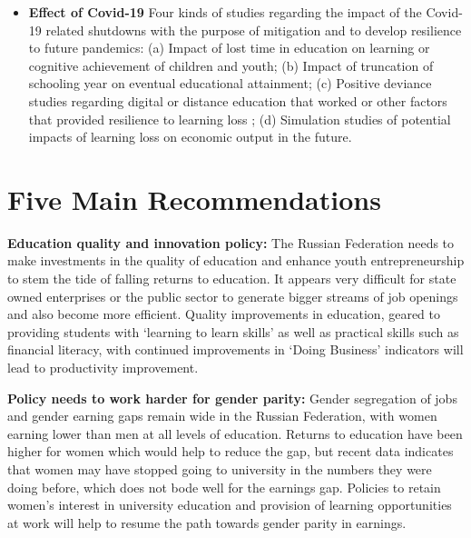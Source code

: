 \documentclass[alpha-refs]{wiley-article-04t}
\begin{document}
\begin{itemize}
\item \textbf{Effect of Covid-19} Four kinds of 
studies regarding the impact of the Covid-19 related shutdowns with the 
purpose of mitigation and to develop resilience 
to future pandemics: (a) Impact of lost time in education on learning or 
cognitive achievement of children and youth; (b) Impact of truncation of 
schooling year on eventual educational attainment; (c) Positive deviance 
studies regarding digital or distance education that worked or other 
factors that provided resilience to learning loss \parencite{pascale2010}; 
(d) Simulation studies of potential impacts of learning loss on economic 
output in the future. 
	
\end{itemize}

\newpage

\section{Five Main Recommendations}

\textbf{Education quality and innovation policy:} The 
Russian Federation needs to make investments in the quality of education 
and enhance youth entrepreneurship to stem the tide of falling returns to 
education. It appears very difficult for state owned enterprises or the 
public sector to generate bigger streams of job openings and also become 
more efficient. Quality improvements in education, geared to providing 
students with `learning to learn skills' as well as practical skills such 
as financial literacy, with continued improvements in `Doing Business' 
indicators will lead to productivity improvement. 
\vspace{0.4em} 

\hspace{-1.8em} \textbf{Policy needs to work harder for gender parity:} 
Gender segregation of jobs and gender earning gaps remain wide in the 
Russian Federation, with women earning lower than men at all levels of 
education. Returns to education have been higher for women which would help 
to reduce the gap, but recent data indicates that women may have stopped 
going to university in the numbers they were doing before, which does not 
bode well for the earnings gap. Policies to retain women's interest in 
university education and provision of learning opportunities at work will 
help to resume the path towards gender parity in earnings.   

\vspace{0.4em} 
\end{document}

